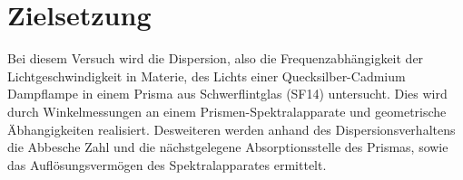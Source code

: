 \section{Zielsetzung}
\label{sec:Zielsetzung}
Bei diesem Versuch wird die Dispersion, also die Frequenzabhängigkeit der Lichtgeschwindigkeit in Materie, des Lichts einer
Quecksilber-Cadmium Dampflampe in einem Prisma aus Schwerflintglas (SF14) untersucht. Dies wird durch Winkelmessungen
an einem Prismen-Spektralapparate und geometrische Äbhangigkeiten realisiert.
Desweiteren werden anhand des Dispersionsverhaltens die Abbesche Zahl und die nächstgelegene Absorptionsstelle des Prismas, sowie das Auflösungsvermögen des
Spektralapparates ermittelt.

